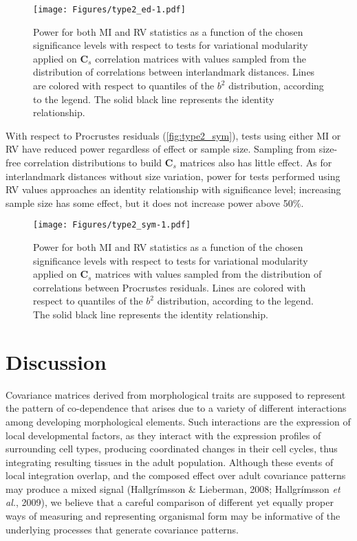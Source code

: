 \documentclass[12pt,]{article}
\begin{document}
\begin{figure}[htbp]
\centering
\texttt{[image: Figures/type2\_ed-1.pdf]}
\caption{Power for both MI and RV statistics as a function of the chosen
significance levels with respect to tests for variational modularity
applied on $\mathbf{C}_s$ correlation matrices with values sampled from
the distribution of correlations between interlandmark distances. Lines
are colored with respect to quantiles of the $b^2$ distribution,
according to the legend. The solid black line represents the identity
relationship. \label{fig:type2_ed}}
\end{figure}

With respect to Procrustes residuals (\autoref{fig:type2_sym}), tests
using either MI or RV have reduced power regardless of effect or sample
size. Sampling from size-free correlation distributions to build
$\mathbf{C}_s$ matrices also has little effect. As for interlandmark
distances without size variation, power for tests performed using RV
values approaches an identity relationship with significance level;
increasing sample size has some effect, but it does not increase power
above 50\%.

\begin{figure}[htbp]
\centering
\texttt{[image: Figures/type2\_sym-1.pdf]}
\caption{Power for both MI and RV statistics as a function of the chosen
significance levels with respect to tests for variational modularity
applied on $\mathbf{C}_s$ matrices with values sampled from the
distribution of correlations between Procrustes residuals. Lines are
colored with respect to quantiles of the $b^2$ distribution, according
to the legend. The solid black line represents the identity
relationship. \label{fig:type2_sym}}
\end{figure}

\section{Discussion}\label{discussion}

Covariance matrices derived from morphological traits are supposed to
represent the pattern of co-dependence that arises due to a variety of
different interactions among developing morphological elements. Such
interactions are the expression of local developmental factors, as they
interact with the expression profiles of surrounding cell types,
producing coordinated changes in their cell cycles, thus integrating
resulting tissues in the adult population. Although these events of
local integration overlap, and the composed effect over adult covariance
patterns may produce a mixed signal (Hallgrímsson \& Lieberman, 2008;
Hallgrímsson \emph{et al.}, 2009), we believe that a careful comparison
of different yet equally proper ways of measuring and representing
organismal form may be informative of the underlying processes that
generate covariance patterns.
\end{document}
